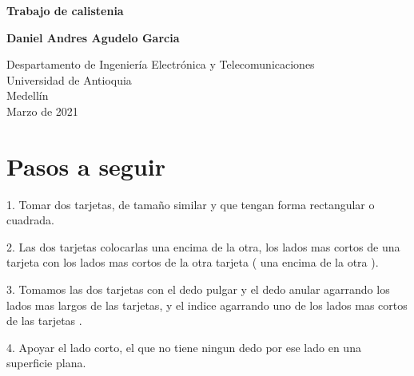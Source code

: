 \documentclass{article}
\begin{document}
\begin{titlepage}
    \begin{center}
        \vspace*{1cm}
            
        \Huge
        \textbf{Trabajo de calistenia}
            
        \vspace{0.5cm}
        \LARGE
        
            
        \vspace{1.5cm}
            
        \textbf{Daniel Andres Agudelo Garcia}
            
        \vfill
            
        \vspace{0.8cm}
            
        \Large
        Despartamento de Ingeniería Electrónica y Telecomunicaciones\\
        Universidad de Antioquia\\
        Medellín\\
        Marzo de 2021
            
    \end{center}
\end{titlepage}

\tableofcontents
\newpage
\section{Pasos a seguir}\label{Pasos a seguir} 


1. Tomar dos tarjetas, de tamaño similar y que tengan forma rectangular o cuadrada. \newline \newline

2. Las dos tarjetas colocarlas una encima de la otra, los lados mas cortos de una tarjeta con los lados mas cortos de la otra tarjeta ( una encima de la otra ). \newline \newline

3. Tomamos las dos tarjetas con el dedo pulgar y el dedo anular agarrando los lados mas largos de las tarjetas, y el indice agarrando uno de los lados mas cortos de las tarjetas . \newline \newline

4. Apoyar el lado corto, el que no tiene ningun dedo por ese lado en una superficie plana. \newline \newline
\end{document}
